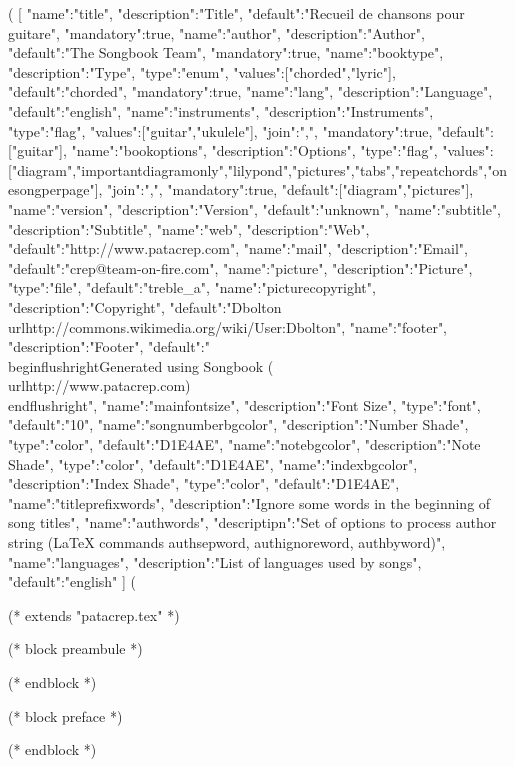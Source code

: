 %
%
%
(%
[
{"name":"title", "description":"Title", "default":"Recueil de chansons pour guitare", "mandatory":true},
{"name":"author", "description":"Author", "default":"The Songbook Team", "mandatory":true},
{"name":"booktype", "description":"Type", "type":"enum", "values":["chorded","lyric"], "default":"chorded", "mandatory":true},
{"name":"lang", "description":"Language", "default":"english"},
{"name":"instruments", "description":"Instruments", "type":"flag", "values":["guitar","ukulele"], "join":",", "mandatory":true, "default":["guitar"]},
{"name":"bookoptions", "description":"Options", "type":"flag", "values":["diagram","importantdiagramonly","lilypond","pictures","tabs","repeatchords","onesongperpage"], "join":",", "mandatory":true, "default":["diagram","pictures"]},
{"name":"version", "description":"Version", "default":"unknown"},
{"name":"subtitle", "description":"Subtitle"},
{"name":"web", "description":"Web", "default":"http://www.patacrep.com"},
{"name":"mail", "description":"Email", "default":"crep@team-on-fire.com"},
{"name":"picture", "description":"Picture", "type":"file", "default":"treble_a"},
{"name":"picturecopyright", "description":"Copyright", "default":"Dbolton \\url{http://commons.wikimedia.org/wiki/User:Dbolton}"},
{"name":"footer", "description":"Footer", "default":"\\begin{flushright}Generated using Songbook (\\url{http://www.patacrep.com})\\end{flushright}"},
{"name":"mainfontsize", "description":"Font Size", "type":"font", "default":"10"},
{"name":"songnumberbgcolor", "description":"Number Shade", "type":"color", "default":"D1E4AE"},
{"name":"notebgcolor", "description":"Note Shade", "type":"color", "default":"D1E4AE"},
{"name":"indexbgcolor", "description":"Index Shade", "type":"color", "default":"D1E4AE"},
{"name":"titleprefixwords", "description":"Ignore some words in the beginning of song titles"},
{"name":"authwords", "descriptipn":"Set of options to process author string (LaTeX commands authsepword, authignoreword, authbyword)"},
{"name":"languages", "description":"List of languages used by songs", "default":"english"}
]
(%

(* extends "patacrep.tex" *)

(* block preambule *)
\usepackage{licence}
(* endblock *)

(* block preface *)
\newpage

\newpage
(* endblock *)
